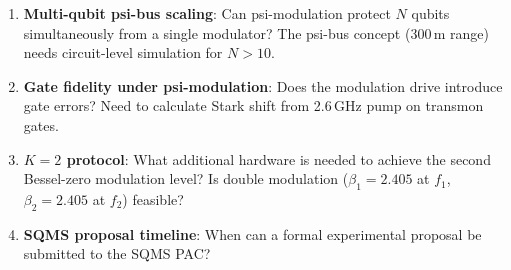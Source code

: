 \documentclass[11pt]{article}
\theoremstyle{definition}
\theoremstyle{remark}
\begin{document}
\begin{enumerate}
\item \textbf{Multi-qubit psi-bus scaling}: Can psi-modulation protect
  $N$ qubits simultaneously from a single modulator? The psi-bus
  concept (300\,m range) needs circuit-level simulation for $N > 10$.
\item \textbf{Gate fidelity under psi-modulation}: Does the modulation
  drive introduce gate errors? Need to calculate Stark shift from
  2.6\,GHz pump on transmon gates.
\item \textbf{$K=2$ protocol}: What additional hardware is needed to
  achieve the second Bessel-zero modulation level? Is double modulation
  ($\beta_1 = 2.405$ at $f_1$, $\beta_2 = 2.405$ at $f_2$) feasible?
\item \textbf{SQMS proposal timeline}: When can a formal experimental
  proposal be submitted to the SQMS PAC?
\end{enumerate}
\end{document}
